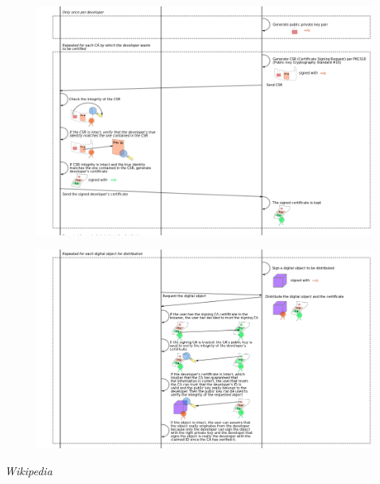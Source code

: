 
\begin{frame}

\begin{figure}
  \includegraphics[width= 0.9\linewidth]{img/Usage-of-Digital-CertificatePart2.png}
\end{figure}

\end{frame}


\begin{frame}

\begin{figure}
  \includegraphics[width= 0.9\linewidth]{img/Usage-of-Digital-CertificatePart3.png}
\end{figure}
\textit{Wikipedia}
\end{frame}


